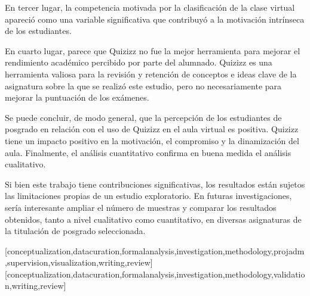 \documentclass[spanish]{textolivre}
\begin{document}
En tercer lugar, la competencia motivada por la clasificación de la clase virtual apareció como una variable significativa que contribuyó a la motivación intrínseca de los estudiantes.

En cuarto lugar, parece que Quizizz no fue la mejor herramienta para mejorar el rendimiento académico percibido por parte del alumnado. Quizizz es una herramienta valiosa para la revisión y retención de conceptos e ideas clave de la asignatura sobre la que se realizó este estudio, pero no necesariamente para mejorar la puntuación de los exámenes.

Se puede concluir, de modo general, que la percepción de los estudiantes de posgrado en relación con el uso de Quizizz en el aula virtual es positiva. Quizizz tiene un impacto positivo en la motivación, el compromiso y la dinamización del aula. Finalmente, el análisis cuantitativo confirma en buena medida el análisis cualitativo.

Si bien este trabajo tiene contribuciones significativas, los resultados están sujetos las limitaciones propias de un estudio exploratorio. En futuras investigaciones, sería interesante ampliar el número de muestras y comparar los resultados obtenidos, tanto a nivel cualitativo como cuantitativo, en diversas asignaturas de la titulación de posgrado seleccionada.

\printbibliography\label{sec-bib}


\begin{contributors}
[conceptualization,datacuration,formalanalysis,investigation,methodology,projadm,supervision,visualization,writing,review]
[conceptualization,datacuration,formalanalysis,investigation,methodology,validation,writing,review]

\end{contributors}
\end{document}
